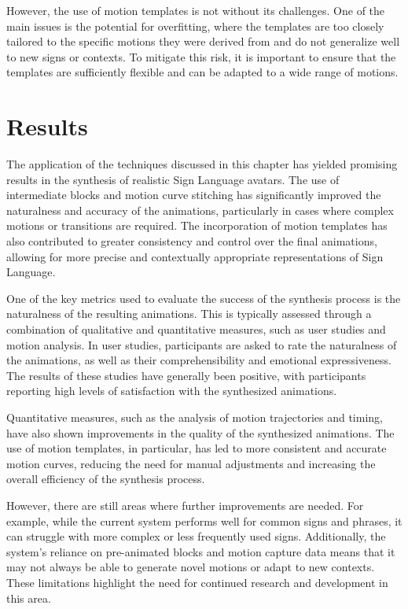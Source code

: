 \documentclass[../../main.tex]{subfiles}
\begin{document}
However, the use of motion templates is not without its challenges. One of the main issues is the potential for overfitting, where the templates are too closely tailored to the specific motions they were derived from and do not generalize well to new signs or contexts. To mitigate this risk, it is important to ensure that the templates are sufficiently flexible and can be adapted to a wide range of motions.

\section{Results}

The application of the techniques discussed in this chapter has yielded promising results in the synthesis of realistic Sign Language avatars. The use of intermediate blocks and motion curve stitching has significantly improved the naturalness and accuracy of the animations, particularly in cases where complex motions or transitions are required. The incorporation of motion templates has also contributed to greater consistency and control over the final animations, allowing for more precise and contextually appropriate representations of Sign Language.

One of the key metrics used to evaluate the success of the synthesis process is the naturalness of the resulting animations. This is typically assessed through a combination of qualitative and quantitative measures, such as user studies and motion analysis. In user studies, participants are asked to rate the naturalness of the animations, as well as their comprehensibility and emotional expressiveness. The results of these studies have generally been positive, with participants reporting high levels of satisfaction with the synthesized animations.

Quantitative measures, such as the analysis of motion trajectories and timing, have also shown improvements in the quality of the synthesized animations. The use of motion templates, in particular, has led to more consistent and accurate motion curves, reducing the need for manual adjustments and increasing the overall efficiency of the synthesis process.

However, there are still areas where further improvements are needed. For example, while the current system performs well for common signs and phrases, it can struggle with more complex or less frequently used signs. Additionally, the system's reliance on pre-animated blocks and motion capture data means that it may not always be able to generate novel motions or adapt to new contexts. These limitations highlight the need for continued research and development in this area.
\end{document}
